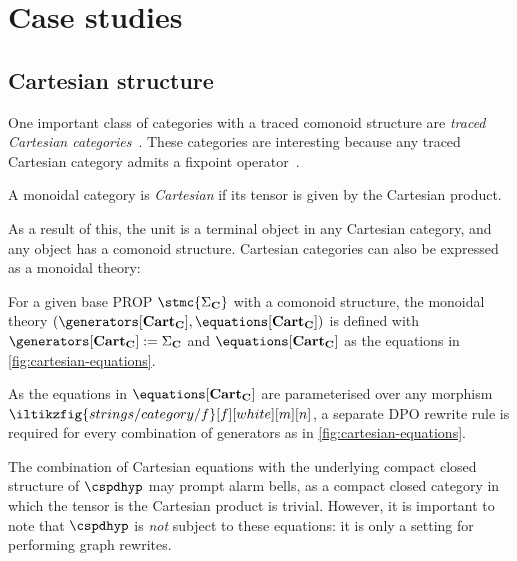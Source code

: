 \section{Case studies}

\subsection{Cartesian structure}

One important class of categories with a traced comonoid structure are
\emph{traced Cartesian categories}~\cite{cazanescu1990new,hasegawa1997recursion}.
These categories are interesting because any traced Cartesian
category admits a fixpoint operator~\cite[Thm. 3.1]{hasegawa1997recursion}.

\begin{definition}
    A monoidal category is \emph{Cartesian} if its tensor is given by the
    Cartesian product.
\end{definition}

As a result of this, the unit is a terminal object in any Cartesian category,
and any object has a comonoid structure.
Cartesian categories can also be expressed as a monoidal theory:

\begin{definition}
    For a given base PROP \(\stmc{\Sigma_\mathbf{C}}\) with a comonoid
    structure, the monoidal theory \((
        \generators[\mathbf{Cart}_\mathbf{C}],
        \equations[\mathbf{Cart}_\mathbf{C}]
    )\) is defined with \(
        \generators[\mathbf{Cart}_\mathbf{C}] := \Sigma_\mathbf{C}
    \) and \(
        \equations[\mathbf{Cart}_\mathbf{C}]
    \) as the equations in \cref{fig:cartesian-equations}.
\end{definition}

As the equations in \(\equations[\mathbf{Cart}_\mathbf{C}]\) are parameterised
over any morphism \(\iltikzfig{strings/category/f}[f][white][m][n]\), a separate
DPO rewrite rule is required for every combination of generators as in
\cref{fig:cartesian-equations}.

\begin{remark}
    The combination of Cartesian equations with the underlying compact closed
    structure of \(\cspdhyp\) may prompt alarm bells, as a compact closed
    category in which the tensor is the Cartesian product is trivial.
    However, it is important to note that \(\cspdhyp\) is \emph{not} subject to
    these equations: it is only a setting for performing graph
    rewrites.
\end{remark}

